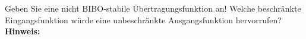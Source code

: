 \begin{question}[section=3,name={BIBO-Stabilität},difficulty=4,type=mdl,tags={}]
	Geben Sie eine nicht BIBO-stabile Übertragungsfunktion an! Welche beschränkte Eingangsfunktion würde eine unbeschränkte Ausgangsfunktion hervorrufen?
	\\ \textbf{Hinweis:}\\
	
\end{question}
\begin{solution}
	
\end{solution}